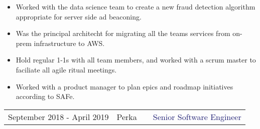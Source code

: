 \documentclass[12t]{article}
\begin{document}
\begin{multicols}{2}
\begin{small}
\begin{itemize}[leftmargin=*,label=\tiny{$\bullet$}]
    \item\begin{minipage}[t]{\linewidth}{Worked with the data science team to create a new fraud detection algorithm appropriate for server side ad beaconing.}\end{minipage}
    \item\begin{minipage}[t]{\linewidth}{Was the principal architecht for migrating all the teams services from on-prem infrastructure to AWS.}\end{minipage}
    \item\begin{minipage}[t]{\linewidth}{Hold regular 1-1s with all team members, and worked with a scrum master to faciliate all agile ritual meetings.}\end{minipage}
    \item\begin{minipage}[t]{\linewidth}{Worked with a product manager to plan epics and roadmap initiatives according to SAFe.}\end{minipage}
    \end{itemize}
  \end{small} 
\end{multicols}

\vspace{15pt}\begin{tabularx}{\textwidth}{@{}llXr}
  September 2018 - April 2019&\textcolor{Mahogany}{Perka}&&\textcolor{MidnightBlue}{Senior Software Engineer}
\end{tabularx}
\end{document}
